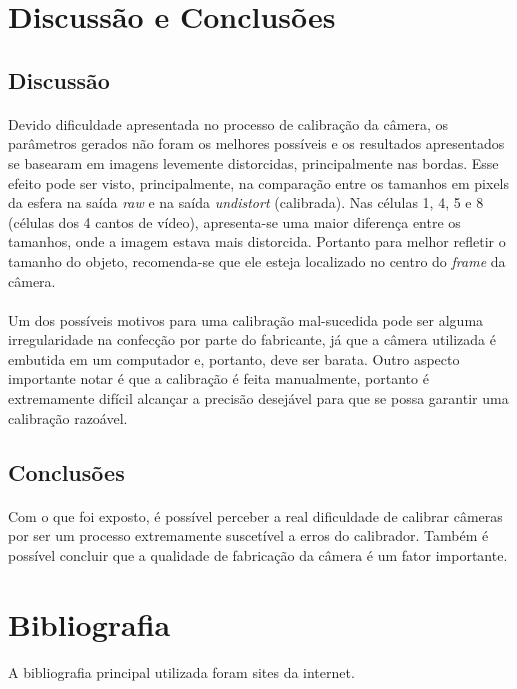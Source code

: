 \documentclass{article}
\begin{document}
	\section{Discussão e Conclusões}
		\subsection{Discussão}
		\paragraph{}
		Devido dificuldade apresentada no processo de calibração da câmera, os parâmetros gerados não foram os melhores possíveis e os resultados apresentados se basearam em imagens levemente distorcidas, principalmente nas bordas. Esse efeito pode ser visto, principalmente, na comparação entre os tamanhos em pixels da esfera na saída \textit{raw} e na saída \textit{undistort} (calibrada). Nas células 1, 4, 5 e 8 (células dos 4 cantos de vídeo), apresenta-se uma maior diferença entre os tamanhos, onde a imagem estava mais distorcida. Portanto para melhor refletir o tamanho do objeto, recomenda-se que ele esteja localizado no centro do \textit{frame} da câmera.
		\paragraph{}
		Um dos possíveis motivos para uma calibração mal-sucedida pode ser alguma irregularidade na confecção por parte do fabricante, já que a câmera utilizada é embutida em um computador e, portanto, deve ser barata. Outro aspecto importante notar é que a calibração é feita manualmente, portanto é extremamente difícil alcançar a precisão desejável para que se possa garantir uma calibração razoável.
		\subsection{Conclusões}
		\paragraph{}
		Com o que foi exposto, é possível perceber a real dificuldade de calibrar câmeras por ser um processo extremamente suscetível a erros do calibrador. Também é possível concluir que a qualidade de fabricação da câmera é um fator importante.
	\section{Bibliografia}
		\paragraph{}
		A bibliografia principal utilizada foram sites da internet. \newline
\end{document}
